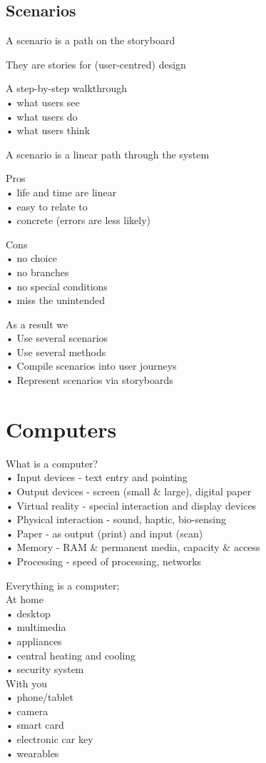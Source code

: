 \documentclass[]{project_plan}
\begin{document}
\subsection{Scenarios}
A scenario is a path on the storyboard

They are stories for (user-centred) design

A step-by-step walkthrough\\
• what users see\\
• what users do\\
• what users think

A scenario is a linear path through the system

Pros\\
• life and time are linear\\
• easy to relate to\\
• concrete (errors are less likely)

\newpage

Cons\\
• no choice\\
• no branches\\
• no special conditions\\
• miss the unintended

As a result we \\
• Use several scenarios\\
• Use several methods\\
• Compile scenarios into user journeys\\
• Represent scenarios via storyboards

\section{Computers}

What is a computer?\\
• Input devices - text entry and pointing\\
• Output devices - screen (small \& large), digital paper\\
• Virtual reality - special interaction and display devices\\
• Physical interaction - sound, haptic, bio-sensing\\
• Paper - as output (print) and input (scan)\\
• Memory - RAM \& permanent media, capacity \& access\\
• Processing - speed of processing, networks

Everything is a computer;\\
At home\\
• desktop\\
• multimedia\\
• appliances\\
• central heating and cooling\\
• security system\\
With you\\
• phone/tablet\\
• camera\\
• smart card\\
• electronic car key\\
• wearables
\end{document}
